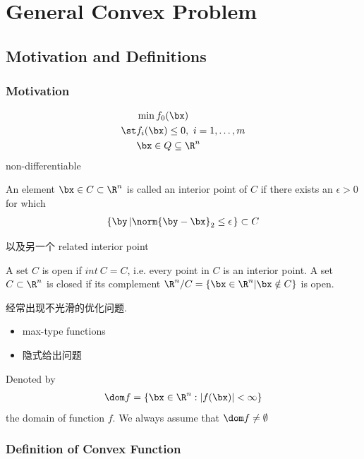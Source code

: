 \newpage
\section{General Convex Problem}

\subsection{Motivation and Definitions}

\subsubsection{Motivation}

\begin{align*}
    &\min f_0(\bx)\\
    \st & f_i(\bx)\le 0,\ i=1,\dots,m\\
    &\bx \in Q \subseteq \R^n
\end{align*}
non-differentiable

\begin{definition}
    An element $\bx \in C\subset \R^n $ is called an interior point of $C$ if there exists an $\epsilon>0$ for which
    \begin{align*}
        \left\{ \by \left| \norm{\by-\bx}_2\le \epsilon \right. \right\}\subset C
    \end{align*}
\end{definition}
以及另一个 related interior point

\begin{definition}
    A set $C$ is open if $int\ C=C$, i.e. every point in $C$ is an interior point. A set $C\subset \R^n$ is closed if its complement $\R^n/C=\left\{ \bx \in \R^n |\bx \notin C \right\}$ is open. 
\end{definition}

经常出现不光滑的优化问题. 
\begin{itemize}
    \item max-type functions
    \item 隐式给出问题
\end{itemize}

Denoted by
\begin{align*}
    \dom f=\left\{ \bx\in\R^n : |f(\bx)|<\infty \right\}
\end{align*}
the domain of function $f$. We always assume that $\dom f \ne \emptyset$

\subsubsection{Definition of Convex Function}

